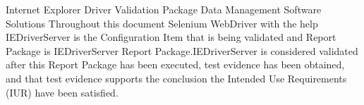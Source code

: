 \documentclass[10pt]{tlc-article}
\begin{document}
  \global\def\configurationitem{IEDriverServer}

  \tlcTitlePageAndTableOfContents
    {Internet Explorer Driver Validation Package}
    {Data Management Software Solutions}
    {Throughout this document Selenium WebDriver with the help IEDriverServer is the Configuration Item that is being
    validated and Report Package is IEDriverServer Report Package.IEDriverServer is considered validated after
    this Report Package has been executed, test evidence has been obtained, and that test evidence supports the conclusion
    the Intended Use Requirements (IUR) have been satisfied.}

  
\end{document}
